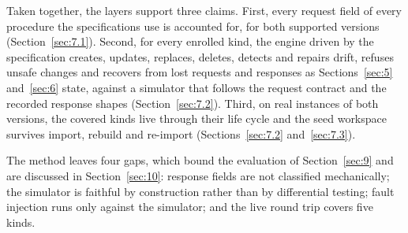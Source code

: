 Taken together, the layers support three claims. First, every request field of every procedure the
specifications use is accounted for, for both supported versions (Section~\ref{sec:7.1}). Second, for every
enrolled kind, the engine driven by the specification creates, updates, replaces, deletes, detects and
repairs drift, refuses unsafe changes and recovers from lost requests and responses as Sections~\ref{sec:5} and~\ref{sec:6} state, against a simulator that follows the request contract and the recorded response shapes
(Section~\ref{sec:7.2}). Third, on real instances of both versions, the covered kinds live through their
life cycle and the seed workspace survives import, rebuild and re-import (Sections~\ref{sec:7.2} and~\ref{sec:7.3}).

The method leaves four gaps, which bound the evaluation of Section~\ref{sec:9} and are discussed in Section~\ref{sec:10}:
response fields are not classified mechanically; the simulator is faithful by construction rather
than by differential testing; fault injection runs only against the simulator; and the live round
trip covers five kinds.
